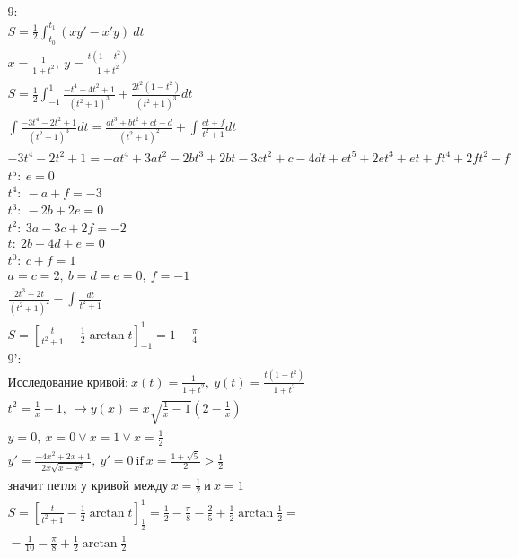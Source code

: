 \documentclass{report}
\begin{document}
\begin{multline}
    \text{9:}\\
    S = \frac{1}{2} \int_{t_0}^{t_1} (xy' - x'y)\ dt\\
    x = \frac{1}{1 + t^2},\ y = \frac{t(1 - t^2)}{1 + t^2}\\
    S = \frac{1}{2} \int_{-1}^{1} \frac{-t^4 - 4t^2 + 1}{(t^2 + 1)^3} + \frac{2t^2(1 - t^2)}{(t^2 + 1)^3} dt\\
    \int \frac{-3t^4 - 2t^2 + 1}{(t^2 + 1)^3} dt = \frac{at^3 + bt^2 + ct + d}{(t^2 + 1)^2} + \int \frac{et + f}{t^2 + 1} dt\\
    -3t^4 - 2t^2 + 1 = -at^4 + 3at^2 - 2bt^3 + 2bt - 3ct^2 + c - 4dt + et^5 + 2et^3 + et + ft^4 + 2ft^2 + f\\
    t^5:\ e = 0\\
    t^4:\ -a + f = -3\\
    t^3:\ -2b + 2e = 0\\
    t^2:\ 3a - 3c + 2f = -2\\
    t:\ 2b - 4d + e = 0\\
    t^0:\ c + f = 1\\
    a = c = 2,\ b = d = e = 0,\ f = -1\\
    \frac{2t^3 + 2t}{(t^2 + 1)^2} - \int \frac{dt}{t^2 + 1}\\
    S = [\frac{t}{t^2 + 1} - \frac{1}{2} \arctan{t}]_{-1}^{1} =
    1 - \frac{\pi}{4}\\
    \text{9':}\\
    \text{Исследование кривой:}\ x(t) = \frac{1}{1 + t^2},\ y(t) = \frac{t(1 - t^2)}{1 + t^2}\\
    t^2 = \frac{1}{x} - 1,\ \to y(x) = x\sqrt{\frac{1}{x} - 1}(2 - \frac{1}{x})\\
    y = 0,\ x = 0 \lor x = 1 \lor x = \frac{1}{2}\\
    y' = \frac{-4x^2 + 2x + 1}{2x \sqrt{x - x^2}},\ y' = 0\ \text{if}\
    x = \frac{1 + \sqrt{5}}{2} > \frac{1}{2}\\
    \text{значит петля у кривой между}\ x = \frac{1}{2}\ \text{и}\ x = 1\\
    S = [\frac{t}{t^2 + 1} - \frac{1}{2}\arctan{t}]_{\frac{1}{2}}^{1} = 
    \frac{1}{2} - \frac{\pi}{8} - \frac{2}{5} + \frac{1}{2} \arctan{\frac{1}{2}} =\\
    = \frac{1}{10} - \frac{\pi}{8} + \frac{1}{2} \arctan{\frac{1}{2}}\\
\end{multline}
\end{document}
